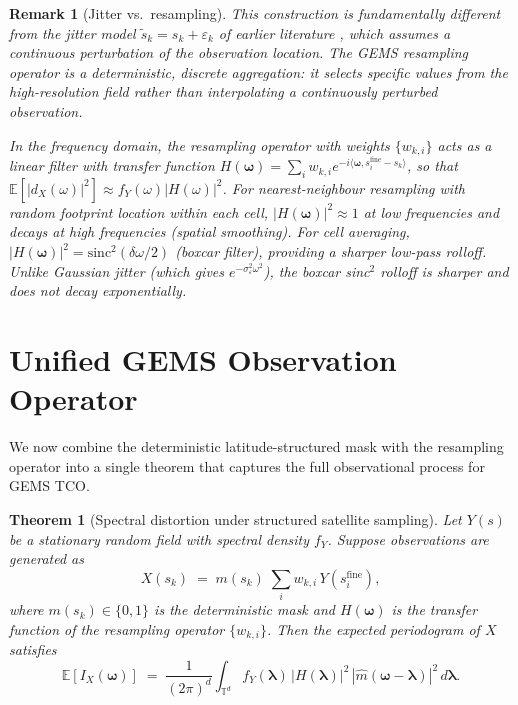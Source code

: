 \documentclass[12pt]{article}
\newtheorem{theorem}{Theorem}
\newtheorem{remark}{Remark}
\begin{document}
\begin{remark}[Jitter vs.\ resampling]
This construction is fundamentally different from the jitter model
$\tilde{s}_k = s_k + \varepsilon_k$ of earlier literature
\citep{Masry1978, Beutler1970}, which assumes a continuous perturbation
of the observation location.
The GEMS resampling operator is a \emph{deterministic, discrete
aggregation}: it selects specific values from the high-resolution field
rather than interpolating a continuously perturbed observation.

In the frequency domain, the resampling operator with weights $\{w_{k,i}\}$
acts as a linear filter with transfer function
$H(\boldsymbol{\omega}) = \sum_i w_{k,i} e^{-i\langle\boldsymbol{\omega},
s_i^{\mathrm{fine}} - s_k\rangle}$, so that
$\mathbb{E}[|d_X(\omega)|^2] \approx f_Y(\omega)|H(\omega)|^2$.
For nearest-neighbour resampling with random footprint location within each
cell,
$|H(\boldsymbol{\omega})|^2 \approx 1$
at low frequencies and decays at high frequencies (spatial smoothing).
For cell averaging,
$|H(\boldsymbol{\omega})|^2 = \mathrm{sinc}^2(\delta\omega/2)$
(boxcar filter), providing a sharper low-pass rolloff.
Unlike Gaussian jitter (which gives $e^{-\sigma^2_\varepsilon\omega^2}$),
the boxcar sinc$^2$ rolloff is sharper and does not decay exponentially.
\end{remark}


\section{Unified GEMS Observation Operator}
\label{sec:unified}

We now combine the deterministic latitude-structured mask with the
resampling operator into a single theorem that captures the full
observational process for GEMS TCO.

\begin{theorem}[Spectral distortion under structured satellite sampling]
\label{thm:gems_operator}
Let $Y(s)$ be a stationary random field with spectral density $f_Y$.
Suppose observations are generated as
\[
    X(s_k)
    \;=\; m(s_k)\;\sum_i w_{k,i}\, Y(s_i^{\mathrm{fine}}),
\]
where $m(s_k) \in \{0,1\}$ is the deterministic mask and $H(\boldsymbol{\omega})$
is the transfer function of the resampling operator $\{w_{k,i}\}$.
Then the expected periodogram of $X$ satisfies
\[
\boxed{
    \mathbb{E}[I_X(\boldsymbol{\omega})]
    \;=\;
    \frac{1}{(2\pi)^d}
    \int_{\mathbb{T}^d}
    f_Y(\boldsymbol{\lambda})\,
    |H(\boldsymbol{\lambda})|^2\,
    |\hat{m}(\boldsymbol{\omega} - \boldsymbol{\lambda})|^2\,
    d\boldsymbol{\lambda}.
}
\]
\end{theorem}
\end{document}
